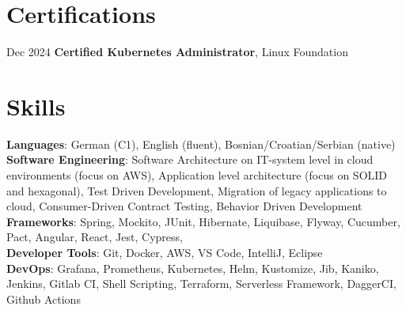 \documentclass[a4paper,12pt]{article}
\makeatletter
\newcommand{\resumeItem}[1]{
	\item\small{
		{#1 \vspace{-2pt}}
	}
}
\newcommand{\resumeProjectHeading}[2]{
	\item
	\begin{tabular*}{0.97\textwidth}{l@{\extracolsep{\fill}}r}
		\small#1 & #2 \\
	\end{tabular*}\vspace{-7pt}
}
\newcommand{\resumeSubHeadingListStart}{\begin{itemize}[leftmargin=0.15in, label={}]}
\newcommand{\resumeSubHeadingListEnd}{\end{itemize}}
\newcommand{\resumeItemListStart}{\begin{itemize}}
\newcommand{\resumeItemListEnd}{\end{itemize}\vspace{-5pt}}
\makeatother
\begin{document}
	
	

	\section{Certifications}
	\begin{itemize}[leftmargin=0.15in, label={}]
		\small {
			\item Dec 2024 \quad \textbf{Certified Kubernetes Administrator}, Linux Foundation
		}
	\end{itemize}
	
	\section{Skills}
	\begin{itemize}[leftmargin=0.15in, label={}]
		\small{
			\item{
				\textbf{Languages}{: German (C1), English (fluent), Bosnian/Croatian/Serbian (native)} \\
				\textbf{Software Engineering}{: Software Architecture on IT-system level in cloud environments (focus on AWS),
					Application level architecture (focus on SOLID and hexagonal), Test Driven Development, Migration of
					legacy applications to cloud, Consumer-Driven Contract Testing, Behavior Driven Development} \\
				\textbf{Frameworks}{: Spring, Mockito, JUnit, Hibernate, Liquibase, Flyway, Cucumber, Pact, Angular, React, Jest, Cypress, } \\
				\textbf{Developer Tools}{: Git, Docker, AWS, VS Code, IntelliJ, Eclipse} \\
				\textbf{DevOps}{: Grafana, Prometheus, Kubernetes, Helm, Kustomize, Jib, Kaniko, Jenkins, Gitlab CI, Shell Scripting, Terraform, Serverless Framework, DaggerCI, Github Actions}
		}}
	\end{itemize}
\end{document}
